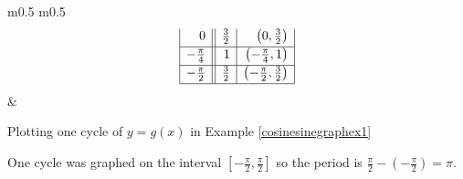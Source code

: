 {\begin{enumerate}
\begin{minipage}{\textwidth}
\begin{center}
\begin{tabular}{m{} m{}}
\[\begin{array}{|r||r|r|}
0 & \frac{3}{2} & \left(0, \frac{3}{2} \right)  \\ [2pt] \hline 

-\frac{\pi}{4}  & 1 &  \left(-\frac{\pi}{4}, 1 \right) \\ [2pt] \hline 

-\frac{\pi}{2} & \frac{3}{2} & \left(-\frac{\pi}{2}, \frac{3}{2} \right) \\  [2pt] \hline
\end{array} \]
\setlength{\extrarowheight}{0pt} & 
\end{tabular}
\end{center}
\captionsetup{type=figure}
\caption{Plotting one cycle of $y=g(x)$ in Example \ref{cosinesinegraphex1}}
\end{minipage}


\medskip

One cycle was graphed on the interval $\left[ -\frac{\pi}{2}, \frac{\pi}{2}\right]$ so the period is $\frac{\pi}{2} - \left(-\frac{\pi}{2}\right) = \pi$. 

\end{enumerate}
}

\medskip

